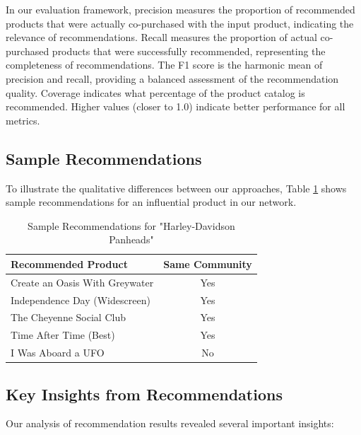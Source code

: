 \documentclass[conference]{IEEEtran}
\begin{document}
In our evaluation framework, precision measures the proportion of recommended products that were actually co-purchased with the input product, indicating the relevance of recommendations. Recall measures the proportion of actual co-purchased products that were successfully recommended, representing the completeness of recommendations. The F1 score is the harmonic mean of precision and recall, providing a balanced assessment of the recommendation quality. Coverage indicates what percentage of the product catalog is recommended. Higher values (closer to 1.0) indicate better performance for all metrics.

\subsection{Sample Recommendations}
To illustrate the qualitative differences between our approaches, Table \ref{tab:sample-recommendations} shows sample recommendations for an influential product in our network.

\begin{table}[ht]
\centering
\caption{Sample Recommendations for "Harley-Davidson Panheads"}
\label{tab:sample-recommendations}
\begin{tabular}{p{5.5cm}c}
\toprule
\textbf{Recommended Product} & \textbf{Same Community} \\
\midrule
Create an Oasis With Greywater & Yes \\
Independence Day (Widescreen) & Yes \\
The Cheyenne Social Club & Yes \\
Time After Time (Best) & Yes \\
I Was Aboard a UFO & No \\
\bottomrule
\end{tabular}
\end{table}

\subsection{Key Insights from Recommendations}
\label{sec:recommendation-insights}

Our analysis of recommendation results revealed several important insights:
\end{document}

